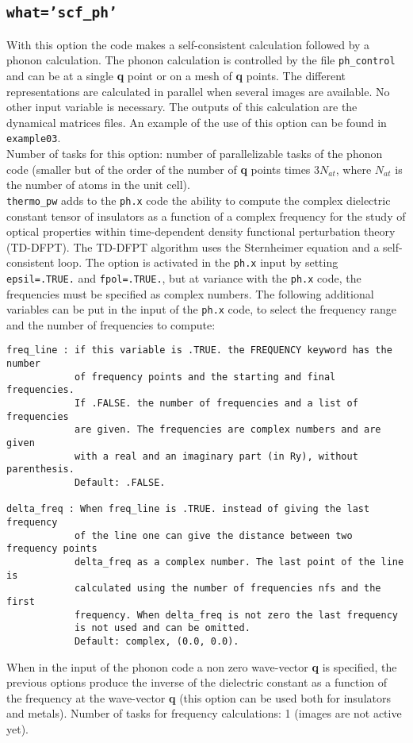 \documentclass[12pt,a4paper]{article}
\begin{document}
\subsection{\color{web-blue}\texttt{what='scf\_ph'}}
With this option the code makes a self-consistent calculation followed
by a phonon calculation. The phonon calculation is controlled by the file
\texttt{ph\_control} and can be at a single {\bf q} point or on a mesh of 
{\bf q} points. 
The different representations are calculated in parallel when several images 
are available. No other input variable is necessary. The outputs of this 
calculation are the dynamical matrices files.
An example of the use of this option can be found in \texttt{example03}. \\
Number of tasks for this option: number of parallelizable tasks of the 
phonon code (smaller but of the order of the number of {\bf q} points times 
$3 N_{at}$, where $N_{at}$ is the number of atoms in the unit cell). \\
\texttt{thermo\_pw} adds to the \texttt{ph.x} code the ability to
compute the complex dielectric constant tensor of insulators as a function 
of a complex frequency for the study of optical properties within 
time-dependent density functional perturbation theory (TD-DFPT). 
The TD-DFPT algorithm uses the Sternheimer equation and a self-consistent loop.
The option is activated in the \texttt{ph.x} input by setting 
\texttt{epsil=.TRUE.} and \texttt{fpol=.TRUE.}, but at variance with
the \texttt{ph.x} code, the frequencies must be specified as complex numbers.
The following additional variables can be put in the input of the \texttt{ph.x}
code, to select the frequency range and the number of frequencies to compute:
\begin{verbatim}
freq_line : if this variable is .TRUE. the FREQUENCY keyword has the number 
            of frequency points and the starting and final frequencies. 
            If .FALSE. the number of frequencies and a list of frequencies 
            are given. The frequencies are complex numbers and are given 
            with a real and an imaginary part (in Ry), without parenthesis.
            Default: .FALSE.

delta_freq : When freq_line is .TRUE. instead of giving the last frequency 
            of the line one can give the distance between two frequency points
            delta_freq as a complex number. The last point of the line is 
            calculated using the number of frequencies nfs and the first 
            frequency. When delta_freq is not zero the last frequency 
            is not used and can be omitted.
            Default: complex, (0.0, 0.0).

\end{verbatim}
When in the input of the phonon code a non zero wave-vector {\bf q}
is specified, the previous options produce the inverse of the dielectric 
constant as a function of the frequency at the wave-vector {\bf q}
(this option can be used both for insulators and metals).
Number of tasks for frequency calculations: 1 (images are not active yet).
\end{document}
